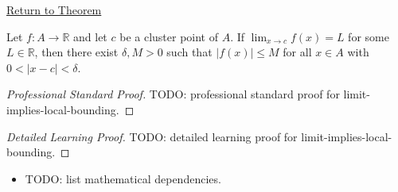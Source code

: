 \newpage
{}
\label{prf:limit-implies-local-bounding}

\begin{remark*}[Return]
\hyperref[thm:limit-implies-local-bounding]{Return to Theorem}
\end{remark*}

\begin{theorem*}
Let $f : A \to \mathbb{R}$ and let $c$ be a cluster point of $A$.
If $\lim_{x\to c}f(x)=L$ for some $L \in \mathbb{R}$,
then there exist $\delta, M > 0$ such that $|f(x)| \leq M$ for all
$x \in A$ with $0<|x-c|<\delta$.

\smallskip\noindent
\end{theorem*}

\begin{proof}[Professional Standard Proof]
\LRAProofBodyStart
TODO: professional standard proof for limit-implies-local-bounding.
\end{proof}

\begin{proof}[Detailed Learning Proof]
\LRAProofBodyStart
TODO: detailed learning proof for limit-implies-local-bounding.
\end{proof}

\begin{remark*}
\end{remark*}

\begin{dependencies}
\begin{itemize}
  \item TODO: list mathematical dependencies.
\end{itemize}
\end{dependencies}

\clearpage
